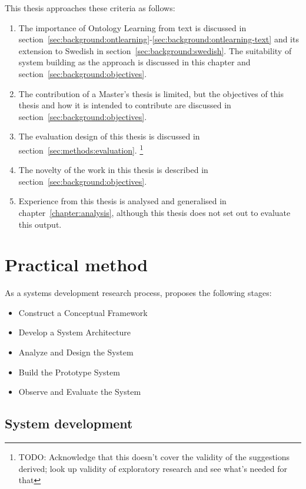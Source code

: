 \documentclass[a4paper]{report}
\newcommand{\todo}[1]{\footnote{{\color{red} TODO: #1}}}
\begin{document}
This thesis approaches these criteria as follows:
\begin{enumerate}
\item The importance of Ontology Learning from text is discussed in section~\ref{sec:background:ontlearning}-\ref{sec:background:ontlearning-text} and its extension to Swedish in section~\ref{sec:background:swedish}.
The suitability of system building as the approach is discussed in this chapter and section~\ref{sec:background:objectives}.
\item The contribution of a Master's thesis is limited, but the objectives of this thesis and how it is intended to contribute are discussed in section~\ref{sec:background:objectives}.
\item The evaluation design of this thesis is discussed in section~\ref{sec:methods:evaluation}.
\todo{Acknowledge that this doesn't cover the validity of the suggestions derived; look up validity of exploratory research and see what's needed for that}
\item The novelty of the work in this thesis is described in section~\ref{sec:background:objectives}.
\item Experience from this thesis is analysed and generalised in chapter~\ref{chapter:analysis}, although this thesis does not set out to evaluate this output.
\end{enumerate}

\section{Practical method}

As a systems development research process, \cite{NunamakerChen90SDResearch} proposes the following stages:

\begin{itemize}
\item Construct a Conceptual Framework
\item Develop a System Architecture
\item Analyze and Design the System
\item Build the Prototype System
\item Observe and Evaluate the System
\end{itemize}

\subsection{System development}
\end{document}
